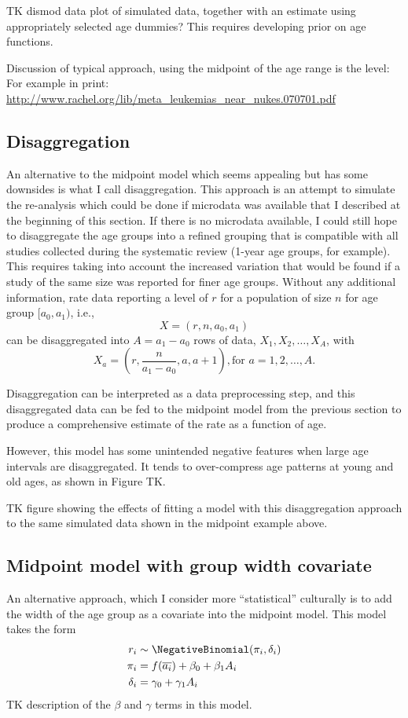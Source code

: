 TK dismod data plot of simulated data, together with an estimate using
appropriately selected age dummies?  This requires developing prior on
age functions.

Discussion of typical approach, using the midpoint of the age range is
the level:
For example in print: \url{
  http://www.rachel.org/lib/meta_leukemias_near_nukes.070701.pdf }

\subsection{Disaggregation}
An alternative to the midpoint model which seems appealing but has
some downsides is what I call disaggregation.  This approach is an
attempt to simulate the re-analysis which could be done if microdata
was available that I described at the beginning of this section.  If
there is no microdata available, I could still hope to disaggregate
the age groups into a refined grouping that is compatible with all
studies collected during the systematic review (1-year age groups, for
example).  This requires taking into account the increased variation
that would be found if a study of the same size was reported for finer
age groups.  Without any additional information, rate data reporting a
level of $r$ for a population of size $n$ for age group $[a_0,a_1)$,
  i.e.,
\[
X = (r, n, a_0, a_1)
\]
can be disaggregated into $A = a_1-a_0$ rows of data, $X_1, X_2,
\ldots, X_A$, with
\[
X_a = (r, \frac{n}{a_1-a_0}, a, a+1), \text{for } a=1,2,\ldots,A.
\]

Disaggregation can  be interpreted as a data preprocessing step, and
this disaggregated data can be fed to the midpoint model from the
previous section to produce a comprehensive estimate of the rate as a
function of age.

However, this model has some unintended negative features when large
age intervals are disaggregated.  It tends to over-compress age
patterns at young and old ages, as shown in Figure TK.

TK figure showing the effects of fitting a model with this
disaggregation approach to the same simulated data shown in the
midpoint example above.

\subsection{Midpoint model with group width covariate}
An alternative approach, which I consider more ``statistical''
culturally is to add the width of the age group as a covariate into
the midpoint model.  This model takes the form
\begin{align*}
r_i &\sim \NegativeBinomial(\pi_i, \delta_i)\\
\pi_i &= f(\overline{a_i}) + \beta_0 + \beta_1 A_i\\
\delta_i &= \gamma_0 + \gamma_1 A_i
\end{align*}
TK description of the $\beta$ and $\gamma$ terms in this model.

